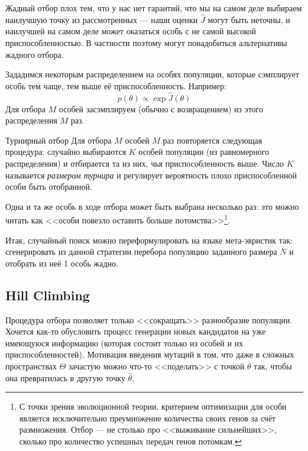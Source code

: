 Жадный отбор плох тем, что у нас нет гарантий, что мы на самом деле выбираем наилучшую точку из рассмотренных --- наши оценки $\hat{J}$ могут быть неточны, и наилучшей на самом деле может оказаться особь с не самой высокой приспособленностью. В частности поэтому могут понадобиться альтернативы жадного отбора.

\begin{example}
Зададимся некоторым распределением на особях популяции, которые сэмплирует особь тем чаще, тем выше её приспособленность. Например:
$$p(\theta) \propto \exp{\hat{J}(\theta)}$$
Для отбора $M$ особей засэмплируем (обычно с возвращением) из этого распределения $M$ раз.
\end{example}

\begin{exampleBox}[label=ex:tournir]{Турнирный отбор}
Для отбора $M$ особей $M$ раз повторяется следующая процедура: случайно выбираются $K$ особей популяции (из равномерного распределения) и отбирается та из них, чья приспособленность выше. Число $K$ называется \emph{размером турнира} и регулирует вероятность плохо приспособленной особи быть отобранной.
\end{exampleBox}

Одна и та же особь в ходе отбора может быть выбрана несколько раз: это можно читать как <<особи повезло оставить больше потомства>>\footnote{С точки зрения эволюционной теории, критерием оптимизации для особи является исключительно преумножение количества своих генов за счёт размножения. Отбор --- не столько про <<выживание сильнейших>>, сколько про количество успешных передач генов потомкам.}.

Итак, случайный поиск можно переформулировать на языке мета-эвристик так: сгенерировать из данной стратегии перебора популяцию заданного размера $N$ и отобрать из неё 1 особь жадно.

\subsection{Hill Climbing}

Процедура отбора позволяет только <<сокращать>> разнообразие популяции. Хочется как-то обусловить процесс генерации новых кандидатов на уже имеющуюся информацию (которая состоит только из особей и их приспособленностей). Мотивация введения мутаций в том, что даже в сложных пространствах $\Theta$ зачастую можно что-то <<поделать>> с точкой $\theta$ так, чтобы она превратилась в другую точку $\hat{\theta}$.

